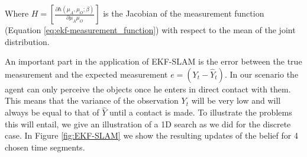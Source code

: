 Where $H = \left[\frac{\partial h(\mu_A,\mu_O;\beta)}{\partial \mu_A\mu_O}\right]$ is the Jacobian of the measurement function (Equation \ref{eq:ekf-measurement_function})  
with respect to the mean of the joint distribution. 

An important part in the application of EKF-SLAM is the error between the true measurement and the expected measurement 
$e = (Y_t - \hat{Y}_t)$. In our scenario the agent can only perceive the objects once he enters in direct contact with them. 
This means that the variance of the observation $Y_t$ will be very low and will always be equal to that of $\hat{Y}$ until a contact is made. To illustrate the problems this will
entail, we give an illustration of a 1D search as we did for the discrete case. In Figure \ref{fig:EKF-SLAM} we show the resulting updates of the belief 
for 4 chosen time segments.

